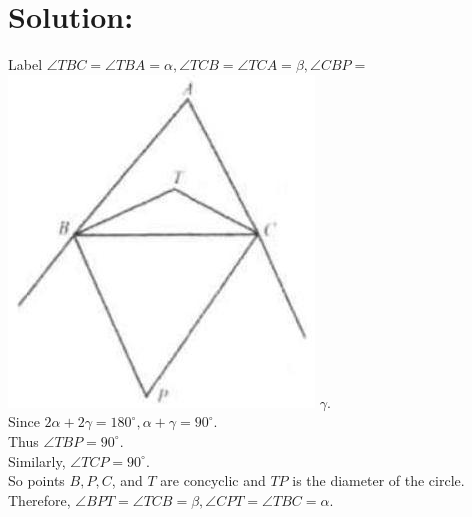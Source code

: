 \documentclass[10pt]{article}
\begin{document}
\section*{Solution:}
Label \(\angle T B C=\angle T B A=\alpha, \angle T C B=\angle T C A=\beta, \angle C B P=\)\\
\includegraphics[max width=\textwidth]{2025_04_17_97bc1f7e44d93c271a88g-195} \(\gamma\).\\
Since \(2 \alpha+2 \gamma=180^{\circ}, \alpha+\gamma=90^{\circ}\).\\
Thus \(\angle T B P=90^{\circ}\).\\
Similarly, \(\angle T C P=90^{\circ}\).\\
So points \(B, P, C\), and \(T\) are concyclic and \(T P\) is the diameter of the circle.\\
Therefore, \(\angle B P T=\angle T C B=\beta, \angle C P T=\angle T B C=\alpha\).\\
\end{document}
